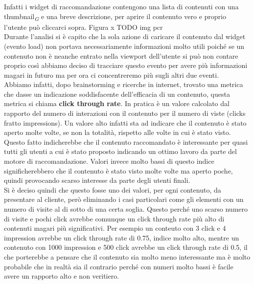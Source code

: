\documentclass[a4paper, 12pt, twoside, openright]{book}
\newcommand{\gloss}[1]{#1\textsubscript{\textit{\tiny{G}}}}
\begin{document}
Infatti i widget di raccomandazione contengono una lista di contenuti con una \gloss{thumbnail} e una breve descrizione, per aprire il contenuto vero e proprio l'utente può cliccarci sopra. Figura x TODO img pcr\\
Durante l'analisi si è capito che la sola azione di caricare il contenuto dal widget (evento load) non portava necessariamente informazioni molto utili poiché se un contenuto non è neanche entrato nella viewport dell'utente si può non contare proprio così abbiamo deciso di tracciare questo evento per avere più informazioni magari in futuro ma per ora ci concentreremo più sugli altri due eventi.\\
Abbiamo infatti, dopo brainstorming e ricerche in internet, trovato una metrica che dasse un indicazione soddisfacente dell'efficacia di un contenuto, questa metrica si chiama \textbf{click through rate}. In pratica è un valore calcolato dal rapporto del numero di interazioni con il contenuto per il numero di viste (clicks fratto impressions). Un valore alto infatti sta ad indicare che il contenuto è stato aperto molte volte, se non la totalità, rispetto alle volte in cui è stato visto. Questo fatto indicherebbe che il contenuto raccomandato è interessante per quasi tutti gli utenti a cui è stato proposto indicando un ottimo lavoro da parte del motore di raccomandazione. Valori invece molto bassi di questo indice significherebbero che il contenuto è stato visto molte volte ma aperto poche, quindi provocando scarso interesse da parte degli utenti finali.\\
Si è deciso quindi che questo fosse uno dei valori, per ogni contenuto, da presentare al cliente, però eliminando i casi particolari come gli elementi con un numero di visite al di sotto di una certa soglia. Questo perché uno scarso numero di visite e pochi click avrebbe comunque un click through rate più alto di contenuti magari più significativi. Per esempio un conteuto con 3 click e 4 impression avrebbe un click through rate di 0.75, indice molto alto, mentre un contenuto con 1000 impression e 500 click avrebbe un click through rate di 0.5, il che porterebbe a pensare che il contenuto sia molto meno interessante ma è molto probabile che in realtà sia il contrario perché con numeri molto bassi è facile avere un rapporto alto e non veritiero.
\end{document}
